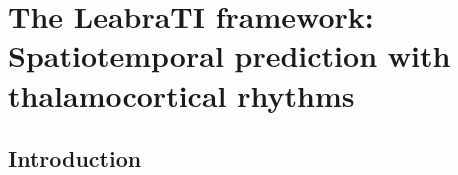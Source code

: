 \documentclass[dwyatte_dissertation.tex]{subfiles}
\begin{document}
\sloppy

\chapter{The LeabraTI framework: Spatiotemporal prediction with thalamocortical rhythms}
\label{chap:leabrati}

%
%
%


\section{Introduction}
%
\end{document}
